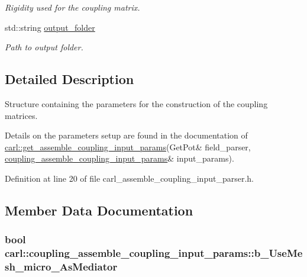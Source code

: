 \begin{DoxyCompactItemize}
\begin{DoxyCompactList}\small\item\em Rigidity used for the coupling matrix. \end{DoxyCompactList}\item 
std\+::string \hyperlink{structcarl_1_1coupling__assemble__coupling__input__params_a1344edd32f644b03b19a499e47fb1ca4}{output\+\_\+folder}
\begin{DoxyCompactList}\small\item\em Path to output folder. \end{DoxyCompactList}\end{DoxyCompactItemize}


\subsection{Detailed Description}
Structure containing the parameters for the construction of the coupling matrices. 

Details on the parameters setup are found in the documentation of \hyperlink{namespacecarl_aba5c04efa5a0abae78d3efd00ae694e3}{carl\+::get\+\_\+assemble\+\_\+coupling\+\_\+input\+\_\+params}(Get\+Pot\& field\+\_\+parser, \hyperlink{structcarl_1_1coupling__assemble__coupling__input__params}{coupling\+\_\+assemble\+\_\+coupling\+\_\+input\+\_\+params}\& input\+\_\+params). 

Definition at line 20 of file carl\+\_\+assemble\+\_\+coupling\+\_\+input\+\_\+parser.\+h.



\subsection{Member Data Documentation}
\hypertarget{structcarl_1_1coupling__assemble__coupling__input__params_adefe0489c1e39fb6bb1965a3e80d2bf5}{}
\subsubsection[{b\+\_\+\+Use\+Mesh\+\_\+micro\+\_\+\+As\+Mediator}]{\setlength{\rightskip}{0pt plus 5cm}bool carl\+::coupling\+\_\+assemble\+\_\+coupling\+\_\+input\+\_\+params\+::b\+\_\+\+Use\+Mesh\+\_\+micro\+\_\+\+As\+Mediator}\label{structcarl_1_1coupling__assemble__coupling__input__params_adefe0489c1e39fb6bb1965a3e80d2bf5}


